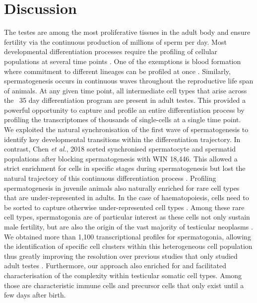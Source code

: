 
\section{Discussion}

The testes are among the most proliferative tissues in the adult body and ensure fertility via the continuous production of millions of sperm per day. Most developmental differentiation processes require the profiling of cellular populations at several time points \citep{Kernfeld2018, Scialdone2016, Wagner2018}. One of the exemptions is blood formation where commitment to different lineages can be profiled at once \citep{Dahlin2018}. Similarly, spermatogenesis occurs in continuous waves throughout the reproductive life span of animals. At any given time point, all intermediate cell types that arise across the ~35 day differentiation program are present in adult testes. This provided a powerful opportunity to capture and profile an entire differentiation process by profiling the transcriptomes of thousands of single-cells at a single time point. \\

We exploited the natural synchronisation of the first wave of spermatogenesis to identify key developmental transitions within the differentiation trajectory. In contrast, Chen \emph{et al.}, 2018 sorted synchronised spermatocyte and spermatid populations after blocking spermatogenesis with WIN 18,446. This allowed a strict enrichment for cells in specific stages during spermatogenesis but lost the natural trajectory of this continuous differentiation process \citep{Chen2018}. Profiling spermatogenesis in juvenile animals also naturally enriched for rare cell types that are under-represented in adults. In the case of haematopoiesis, cells need to be sorted to capture otherwise under-represented cell types \citep{Dahlin2018}. Among these rare cell types, spermatogonia are of particular interest as these cells not only sustain male fertility, but are also the origin of the vast majority of testicular neoplasms \citep{Bosl1997}. We obtained more than 1,100 transcriptional profiles for spermatogonia, allowing the identification of specific cell clusters within this heterogeneous cell population thus greatly improving the resolution over previous studies that only studied adult testes \citep{Lukassen2018}. Furthermore, our approach also enriched for and facilitated characterisation of the complexity within testicular somatic cell types. Among those are characteristic immune cells and precursor cells that only exist until a few days after birth.\\

